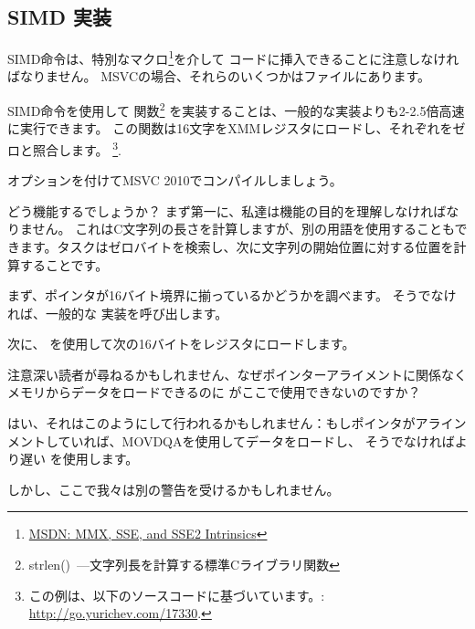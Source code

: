 ﻿\subsection{SIMD \strlen 実装}
\label{SIMD_strlen}

\newcommand{\URLMSDNSSE}{\href{http://go.yurichev.com/17262}{MSDN: MMX, SSE, and SSE2 Intrinsics}}

SIMD命令は、特別なマクロ\footnote{\URLMSDNSSE}を介して \CCpp コードに挿入できることに注意しなければなりません。 
MSVCの場合、それらのいくつかはファイルにあります。

\newcommand{\URLSTRLEN}{http://go.yurichev.com/17330}


SIMD命令を使用して \strlen 関数\footnote{strlen()~---文字列長を計算する標準Cライブラリ関数}
を実装することは、一般的な実装よりも2-2.5倍高速に実行できます。
この関数は16文字をXMMレジスタにロードし、それぞれをゼロと照合します。
\footnote{
この例は、以下のソースコードに基づいています。: \url{\URLSTRLEN}.}.



\Ox オプションを付けてMSVC 2010でコンパイルしましょう。



どう機能するでしょうか？
まず第一に、私達は機能の目的を理解しなければなりません。
これはC文字列の長さを計算しますが、別の用語を使用することもできます。タスクはゼロバイトを検索し、次に文字列の開始位置に対する位置を計算することです。

まず、ポインタが16バイト境界に揃っているかどうかを調べます。
そうでなければ、一般的な \strlen 実装を呼び出します。

次に、 \MOVDQA を使用して次の16バイトをレジスタにロードします。

注意深い読者が尋ねるかもしれません、なぜポインターアライメントに関係なくメモリからデータをロードできるのに
\MOVDQU がここで使用できないのですか？

はい、それはこのようにして行われるかもしれません：もしポインタがアラインメントしていれば、MOVDQAを使用してデータをロードし、
そうでなければより遅い \MOVDQU を使用します。

しかし、ここで我々は別の警告を受けるかもしれません。

\newcommand{\URLPAGE}{\href{http://go.yurichev.com/17136}{wikipedia}}

